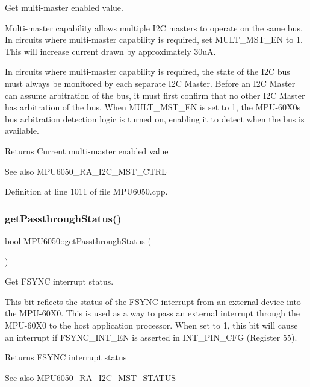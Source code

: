Get multi-\/master enabled value. 

Multi-\/master capability allows multiple I2C masters to operate on the same bus. In circuits where multi-\/master capability is required, set M\+U\+L\+T\+\_\+\+M\+S\+T\+\_\+\+EN to 1. This will increase current drawn by approximately 30uA.

In circuits where multi-\/master capability is required, the state of the I2C bus must always be monitored by each separate I2C Master. Before an I2C Master can assume arbitration of the bus, it must first confirm that no other I2C Master has arbitration of the bus. When M\+U\+L\+T\+\_\+\+M\+S\+T\+\_\+\+EN is set to 1, the M\+P\+U-\/60\+X0\textquotesingle{}s bus arbitration detection logic is turned on, enabling it to detect when the bus is available.

\begin{DoxyReturn}{Returns}
Current multi-\/master enabled value 
\end{DoxyReturn}
\begin{DoxySeeAlso}{See also}
M\+P\+U6050\+\_\+\+R\+A\+\_\+\+I2\+C\+\_\+\+M\+S\+T\+\_\+\+C\+T\+RL 
\end{DoxySeeAlso}


Definition at line 1011 of file M\+P\+U6050.\+cpp.

\mbox{\label{classMPU6050_af2820067b73f177d985ed81e894281b0}} 
\subsubsection{\texorpdfstring{getPassthroughStatus()}{getPassthroughStatus()}}
{\footnotesize\ttfamily bool M\+P\+U6050\+::get\+Passthrough\+Status (\begin{DoxyParamCaption}{ }\end{DoxyParamCaption})}



Get F\+S\+Y\+NC interrupt status. 

This bit reflects the status of the F\+S\+Y\+NC interrupt from an external device into the M\+P\+U-\/60\+X0. This is used as a way to pass an external interrupt through the M\+P\+U-\/60\+X0 to the host application processor. When set to 1, this bit will cause an interrupt if F\+S\+Y\+N\+C\+\_\+\+I\+N\+T\+\_\+\+EN is asserted in I\+N\+T\+\_\+\+P\+I\+N\+\_\+\+C\+FG (Register 55). \begin{DoxyReturn}{Returns}
F\+S\+Y\+NC interrupt status 
\end{DoxyReturn}
\begin{DoxySeeAlso}{See also}
M\+P\+U6050\+\_\+\+R\+A\+\_\+\+I2\+C\+\_\+\+M\+S\+T\+\_\+\+S\+T\+A\+T\+US 
\end{DoxySeeAlso}



